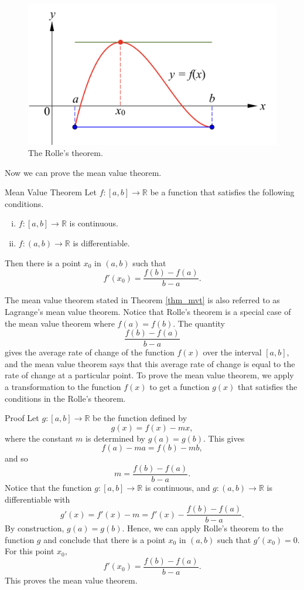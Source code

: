  \begin{figure}[ht]
\centering
\includegraphics[scale=0.2]{Picture23.png}
\caption{  The Rolle's theorem.\fa}\label{figure23}
\end{figure}

Now we can prove the mean value theorem.
\begin{theorem}[label=thm_mvt]{Mean Value Theorem}
Let $f:[a,b]\to\mathbb{R}$ be a function that satisfies the following conditions.
\begin{enumerate}[(i)]
\item $f:[a,b]\to\mathbb{R}$ is continuous.
\item $f:(a, b)\to\mathbb{R}$ is differentiable.
 
\end{enumerate}
Then there is a point $x_0$ in $(a, b)$ such that \[f'(x_0)=\frac{f(b)-f(a)}{b-a}.\]
\end{theorem}
The mean value theorem stated in Theorem \ref{thm_mvt} is also referred to as Lagrange's mean value theorem.
Notice that Rolle's theorem is a special case of the mean value theorem where $f(a)=f(b)$. The quantity 
\[\frac{f(b)-f(a)}{b-a}\] gives the average rate of change of the function $f(x)$ over the interval $[a, b]$, and the mean value theorem says that this average rate of change is equal to the rate of change at a particular point. To prove the mean value theorem, we apply a transformation to the function $f(x)$ to get a function $g(x)$ that satisfies the conditions in the Rolle's theorem.  
\begin{myproof}{Proof}
Let $g:[a,b]\to\mathbb{R}$ be the function defined by \[g(x)= f(x)-mx,\]
where the constant $m$ is determined by $g(a)=g(b)$.
This gives
\[f(a)-ma=f(b)-mb,\]
and so
\[m=\frac{f(b)-f(a)}{b-a}.\]Notice that the function $g:[a,b]\to\mathbb{R}$ is continuous, and $g:(a, b)\to \mathbb{R}$ is differentiable with
\[g'(x)=f'(x)-m=f'(x)-\frac{f(b)-f(a)}{b-a}.\]
By construction, $g(a)=g(b)$. Hence, we can apply Rolle's theorem to the function $g$ and conclude that there is a point $x_0$ in $(a,b)$ such that $g'(x_0)=0$. For this point $x_0$,
\[f'(x_0)=\frac{f(b)-f(a)}{b-a}.\]This proves the mean value theorem.
\end{myproof}


